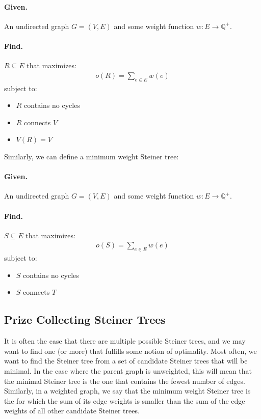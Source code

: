 \documentclass[12pt,twoside]{reedthesis}
\theoremstyle{definition}
\begin{document}
 \bigbreak

 \hfill\begin{minipage}{\dimexpr\textwidth-2cm}
 \paragraph{Given.}An undirected graph $G=(V,E)$ and some weight function $w:E \rightarrow \mathbb{Q}^+$.
 \paragraph{Find.}$R \subseteq E$ that maximizes:
 \begin{align*}
  o(R)=\sum_{e \in E}w(e)
 \end{align*}
 subject to:
 \begin{itemize}
   \item{$R$ contains no cycles}
   \item{$R$ connects $V$}
   \item{$V(R) = V$}
 \end{itemize}
\xdef\tpd{\the\prevdepth}
\end{minipage}

Similarly, we can define a minimum weight Steiner tree:

 \bigbreak

 \hfill\begin{minipage}{\dimexpr\textwidth-2cm}
 \paragraph{Given.}An undirected graph $G=(V,E)$ and some weight function $w:E \rightarrow \mathbb{Q}^+$.
 \paragraph{Find.}$S \subseteq E$ that maximizes:
 \begin{align*}
  o(S)=\sum_{e \in E}w(e)
 \end{align*}
 subject to:
 \begin{itemize}
   \item{$S$ contains no cycles}
   \item{$S$ connects $T$}
 \end{itemize}
\xdef\tpd{\the\prevdepth}
\end{minipage}


  \subsection{Prize Collecting Steiner Trees}
  It is often the case that there are multiple possible Steiner trees, and we may want to find one (or more) that fulfills some notion of optimality. Most often, we want to find the Steiner tree from a set of candidate Steiner trees that will be minimal. In the case where the parent graph is unweighted, this will mean that the minimal Steiner tree is the one that contains the fewest number of edges. Similarly, in a weighted graph, we say that the minimum weight Steiner tree is the for which the sum of its edge weights is smaller than the sum of the edge weights of all other candidate Steiner trees.\par
\end{document}
